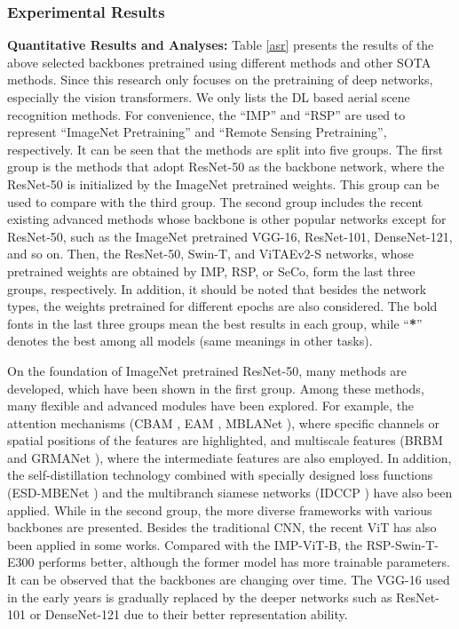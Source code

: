 \documentclass[10pt, journal,twoside]{IEEEtran}
\begin{document}
\subsubsection{Experimental Results}
\textbf{Quantitative Results and Analyses:} Table \ref{asr} presents the results of the above selected backbones pretrained using different methods and other SOTA methods. Since this research only focuses on the pretraining of deep networks, especially the vision transformers. We only lists the DL based aerial scene recognition methods. For convenience, the ``IMP'' and ``RSP'' are used to represent ``ImageNet Pretraining'' and ``Remote Sensing Pretraining'', respectively. It can be seen that the methods are split into five groups. The first group is the methods that adopt ResNet-50 as the backbone network, where the ResNet-50 is initialized by the ImageNet pretrained weights. This group can be used to compare with the third group. The second group includes the recent existing advanced methods whose backbone is other popular networks except for ResNet-50, such as the ImageNet pretrained VGG-16, ResNet-101, DenseNet-121, and so on. Then, the ResNet-50, Swin-T, and ViTAEv2-S networks, whose pretrained weights are obtained by IMP, RSP, or SeCo, form the last three groups, respectively. In addition, it should be noted that besides the network types, the weights pretrained for different epochs are also considered. The bold fonts in the last three groups mean the best results in each group, while ``\textbf{*}'' denotes the best among all models (same meanings in other tasks).

On the foundation of ImageNet pretrained ResNet-50, many methods are developed, which have been shown in the first group. Among these methods, many flexible and advanced modules have been explored. For example, the attention mechanisms (CBAM \cite{cbam}, EAM \cite{asr_2021_grsl_eam}, MBLANet \cite{mblanet_2021_asr}), where specific channels or spatial positions of the features are highlighted, and multiscale features (BRBM \cite{asr_2021_jstars_f2brbm} and GRMANet \cite{asr_2022_tgrs_grmanet}), where the intermediate features are also employed. In addition, the self-distillation technology combined with specially designed loss functions (ESD-MBENet \cite{ESDMBENet_2021_asr}) and the multibranch siamese networks (IDCCP \cite{asr_2021_tgrs_idccp}) have also been applied. While in the second group, the more diverse frameworks with various backbones are presented. Besides the traditional CNN, the recent ViT has also been applied in some works. Compared with the IMP-ViT-B, the RSP-Swin-T-E300 performs better, although the former model has more trainable parameters. It can be observed that the backbones are changing over time. The VGG-16 used in the early years is gradually replaced by the deeper networks such as ResNet-101 or DenseNet-121 due to their better representation ability. 
\end{document}
